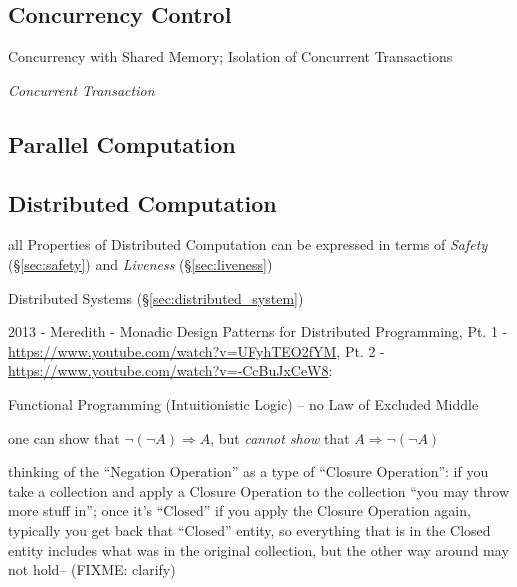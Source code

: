 \subsection{Concurrency Control}\label{sec:concurrency_control}

Concurrency with Shared Memory; Isolation of Concurrent Transactions

\emph{Concurrent Transaction}



\subsection{Parallel Computation}\label{sec:parallel_computation}

\subsection{Distributed Computation}\label{sec:distributed_computation}

all Properties of Distributed Computation can be expressed in terms of
\emph{Safety} (\S\ref{sec:safety}) and \emph{Liveness}
(\S\ref{sec:liveness})

\fist Distributed Systems (\S\ref{sec:distributed_system})

\asterism

2013 - Meredith - Monadic Design Patterns for Distributed Programming, Pt. 1 -
\url{https://www.youtube.com/watch?v=UFyhTEO2fYM}, Pt. 2 -
\url{https://www.youtube.com/watch?v=-CcBuJxCeW8}:

Functional Programming (Intuitionistic Logic) -- no Law of Excluded Middle

one can show that $\neg(\neg A) \Rightarrow A$, but \emph{cannot show} that
$A \Rightarrow \neg(\neg A)$

thinking of the ``Negation Operation'' as a type of ``Closure Operation'': if
you take a collection and apply a Closure Operation to the collection ``you may
throw more stuff in''; once it's ``Closed'' if you apply the Closure Operation
again, typically you get back that ``Closed'' entity, so everything that is in
the Closed entity includes what was in the original collection, but the other
way around may not hold-- (FIXME: clarify)


